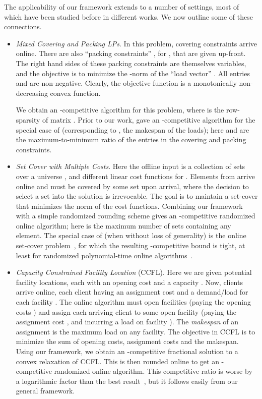 \documentclass[letterpaper,11pt]{article}
\begin{document}
\def\b{b}  
The applicability of our framework extends to a number of settings,
most of which have been studied before in different works. We now
outline some of these connections.
\begin{itemize}
\item {\em Mixed Covering and Packing LPs}. In this problem, covering constraints  arrive online. There are also  ``packing constraints'' , for , that are given up-front. The right hand sides  of these packing constraints are themselves variables, and the objective is to minimize the -norm  of the ``load vector'' . All entries  and  are non-negative.
    Clearly, the objective function is a monotonically non-decreasing convex function.


  We obtain an -competitive algorithm for this problem,
  where  is the row-sparsity of matrix . Prior to our work,
  \cite{ABFP13} gave an -competitive algorithm for the special case of 
  (corresponding to , the makespan of the
  loads); here  and  are the maximum-to-minimum ratio of the
  entries in the covering and packing constraints.

\item {\em Set Cover with Multiple Costs}.
Here the offline input is a
  collection of  sets  over a universe , and
   different linear  cost functions  for
  . Elements from  arrive online and must be covered by
  some set upon arrival, where the decision to select a set into the
  solution is irrevocable. The goal is to maintain a set-cover that
  minimizes the  norm of the  cost functions. Combining our
  framework with a simple randomized rounding scheme gives an
  -competitive
  randomized online
  algorithm; here  is the maximum number of sets containing any
  element. The special case of  (when  without loss of generality)
  is the online set-cover problem~\cite{AAABN03}, for which the
  resulting -competitive bound is tight, at least for
  randomized polynomial-time online algorithms~\cite{Korman05}.

\item {\em Capacity Constrained Facility Location} (CCFL). Here we are
  given  potential facility locations, each with an opening cost 
  and a capacity . Now,  clients arrive online, each client  having an assignment cost  and a demand/load  for
  each facility . The online algorithm must open facilities
  (paying the opening costs ) and assign each arriving client 
  to some open facility  (paying the assignment cost , and
  incurring a load  on facility ). The \emph{makespan} of an
  assignment is the maximum load on any facility. The objective in CCFL
  is to minimize the sum of opening costs, assignment costs and the
  makespan. Using our framework, we obtain an -competitive
  fractional solution to a convex relaxation of CCFL. This is then
  rounded online to get an -competitive randomized
  online algorithm. This competitive ratio is worse by a logarithmic
  factor than the best result~\cite{ABFP13}, but it follows easily from
  our general framework.


\end{itemize}
\end{document}
